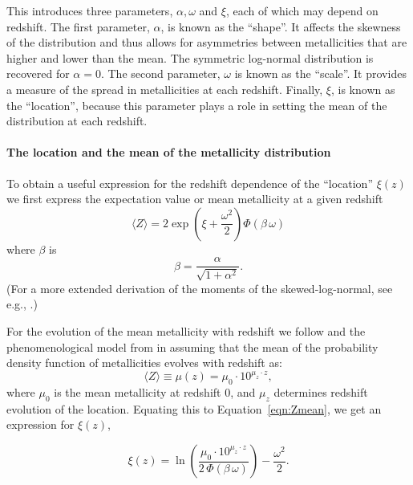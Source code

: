 \documentclass[linenumbers,twocolumn]{aastex631}
\begin{document}
%
\noindent This introduces three parameters, $\alpha, \omega$ and $\xi$, each of which may depend on redshift. The first parameter, $\alpha$, is known as the ``shape''. It affects the skewness of the distribution and thus allows for asymmetries between metallicities that are higher and lower than the mean.  The symmetric log-normal distribution is recovered for $\alpha=0$. The second parameter, $\omega$  is known as the ``scale''. It provides a measure of the spread in metallicities at each redshift.   Finally, $\xi$, is known as the ``location'', because this parameter plays a role in setting the mean of the distribution at each redshift.

\paragraph{The location and the mean of the metallicity distribution}
To obtain a useful expression for the redshift dependence of the ``location'' $\xi(z)$ we first express the expectation value or mean metallicity at a given redshift
\begin{equation}
 \langle  Z \rangle 
 = 2 \exp
        \left(\xi +  \frac{\omega^2}{2} \right)
         \Phi\left(\beta\, \omega\right)
 \label{eqn:Zmean}
\end{equation}
where $\beta$ is 
\begin{equation}
\label{eq: beta}
\beta = \frac{\alpha}{\sqrt{1 + \alpha^2} }.
\end{equation}
(For a more extended derivation of the moments of the skewed-log-normal, see e.g., \cite{WANG201995}.)

For the evolution of the mean metallicity with redshift we follow \cite{LangerNorman2006} and the phenomenological model from \cite{Neijssel+2019} in assuming that the mean of the probability density function of metallicities evolves with redshift as:
\begin{equation}
\label{eq: mean Z}
    \langle Z \rangle \equiv \mu(z) = \mu_0 \cdot 10^{\mu_z \cdot z},
\end{equation}
where $\mu_0
$ is the mean metallicity at redshift 0, and $\mu_z
$ determines redshift evolution of the location. Equating this to Equation~\ref{eqn:Zmean}, we get an expression for $\xi(z)$,


\begin{equation}
\label{eq mu z}
    \xi(z) = \ln\left(\frac{  \mu_0 \cdot 10^{\mu_z \cdot z} }{2\, \Phi(\beta\, \omega)}  \right) - \frac{\omega^2}{2}.
\end{equation}
\end{document}
